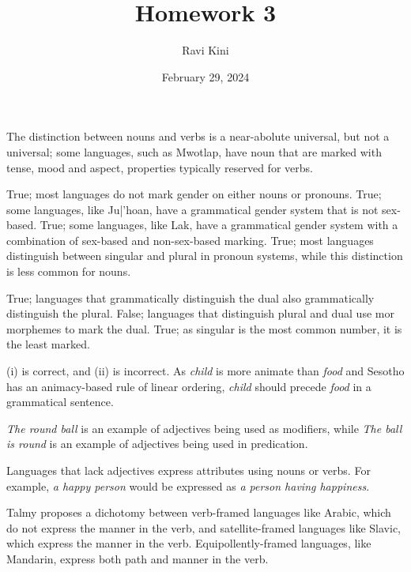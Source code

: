 \documentclass{article}
\title{Homework 3}
\author{Ravi Kini}
\date{February 29, 2024}
\begin{document}
\maketitle

\problem
The distinction between nouns and verbs is a near-abolute universal, but not a universal; some languages, such as Mwotlap, have noun that are marked with tense, mood and aspect, properties typically reserved for verbs.

\clearpage

\problem
{}
True; most languages do not mark gender on either nouns or pronouns.
True; some languages, like Ju|'hoan, have a grammatical gender system that is not sex-based.
True; some languages, like Lak, have a grammatical gender system with a combination of sex-based and non-sex-based marking.
True; most languages distinguish between singular and plural in pronoun systems, while this distinction is less common for nouns.

\clearpage

\problem
{}
True; languages that grammatically distinguish the dual also grammatically distinguish the plural.
False; languages that distinguish plural and dual use mor morphemes to mark the dual.
True; as singular is the most common number, it is the least marked.

\clearpage

\problem
(i) is correct, and (ii) is incorrect. As \textit{child} is more animate than \textit{food} and Sesotho has an animacy-based rule of linear ordering, \textit{child} should precede \textit{food} in a grammatical sentence.

\clearpage

\problem
\textit{The round ball} is an example of adjectives being used as modifiers, while \textit{The ball is round} is an example of adjectives being used in predication.

\clearpage

\problem
Languages that lack adjectives express attributes using nouns or verbs. For example, \textit{a happy person} would be expressed as \textit{a person having happiness}.

\clearpage

\problem
Talmy proposes a dichotomy between verb-framed languages like Arabic, which do not express the manner in the verb, and satellite-framed languages like Slavic, which express the manner in the verb. Equipollently-framed languages, like Mandarin, express both path and manner in the verb.
\end{document}
